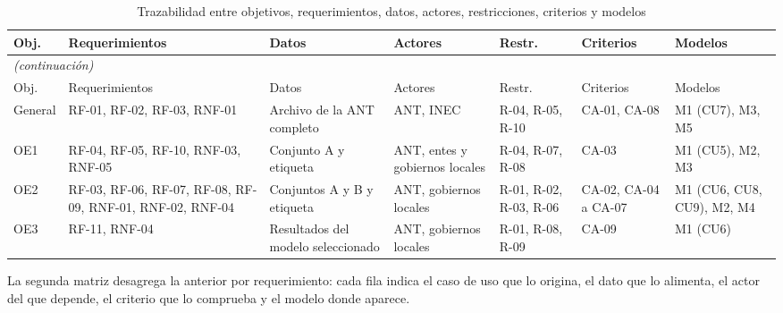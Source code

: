 \begin{longtable}{p{1.3cm}p{2.7cm}p{2.0cm}p{2.0cm}p{1.6cm}p{1.8cm}p{1.8cm}}
\caption{Trazabilidad entre objetivos, requerimientos, datos, actores, restricciones, criterios y modelos}
\label{tab:trazabilidad}\\
\toprule
Obj. & Requerimientos & Datos & Actores & Restr. & Criterios & Modelos \\
\midrule
\endfirsthead
\multicolumn{7}{l}{\footnotesize\itshape (continuación)}\\
\toprule
Obj. & Requerimientos & Datos & Actores & Restr. & Criterios & Modelos \\
\midrule
\endhead
\bottomrule
\endfoot
General & RF-01, RF-02, RF-03, RNF-01 & Archivo de la ANT completo & ANT, INEC & R-04, R-05, R-10 & CA-01, CA-08 & M1 (CU7), M3, M5 \\
OE1 & RF-04, RF-05, RF-10, RNF-03, RNF-05 & Conjunto A y etiqueta & ANT, entes y gobiernos locales & R-04, R-07, R-08 & CA-03 & M1 (CU5), M2, M3 \\
OE2 & RF-03, RF-06, RF-07, RF-08, RF-09, RNF-01, RNF-02, RNF-04 & Conjuntos A y B y etiqueta & ANT, gobiernos locales & R-01, R-02, R-03, R-06 & CA-02, CA-04 a CA-07 & M1 (CU6, CU8, CU9), M2, M4 \\
OE3 & RF-11, RNF-04 & Resultados del modelo seleccionado & ANT, gobiernos locales & R-01, R-08, R-09 & CA-09 & M1 (CU6) \\
\end{longtable}

La segunda matriz desagrega la anterior por requerimiento: cada fila indica el caso de uso que lo origina, el dato que lo alimenta, el actor del que depende, el criterio que lo comprueba y el modelo donde aparece.

